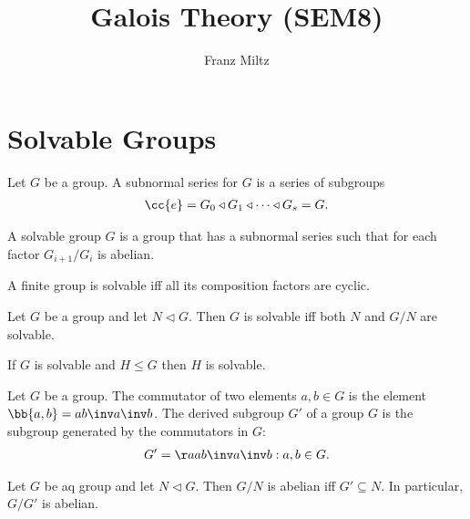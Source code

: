 \documentclass{article}
\begin{document}
\mkthmstwounified
\title{Galois Theory (SEM8)}
\author{Franz Miltz}
\maketitle
\tableofcontents
\pagebreak

\setcounter{section}{-1}

\section{Solvable Groups}\label{sec:solvable_groups}

\begin{definition}
  Let $G$ be a group. A subnormal series for $G$ is a series of subgroups
  \begin{align*}
    \cc{e}=G_0\triangleleft G_1\triangleleft\cdots\triangleleft G_s=G.
  \end{align*}
\end{definition}

\begin{definition}
  A solvable group $G$ is a group that has a subnormal series such that for each
  factor $G_{i+1}/G_i$ is abelian.
\end{definition}

\begin{theorem}
  A finite group is solvable iff all its composition factors are cyclic.
\end{theorem}

\begin{theorem}
  Let $G$ be a group and let $N\triangleleft G$. Then $G$ is solvable iff both $N$ and
  $G/N$ are solvable.
\end{theorem}

\begin{theorem}
  If $G$ is solvable and $H\leq G$ then $H$ is solvable.
\end{theorem}

\begin{definition}
  Let $G$ be a group. The commutator of two elements $a,b\in G$ is the element
  $\bb{a,b}=ab\inv a\inv b$. The derived subgroup $G'$ of a group $G$ is the subgroup
  generated by the commutators in $G$:
  \begin{align*}
    G'=\aa{ab\inv a\inv b : a,b \in G}.
  \end{align*}
\end{definition}

\begin{theorem}
  Let $G$ be aq group and let $N\triangleleft G$. Then $G/N$ is abelian iff $G'\subseteq N$.
  In particular, $G/G'$ is abelian.
\end{theorem}
\end{document}
